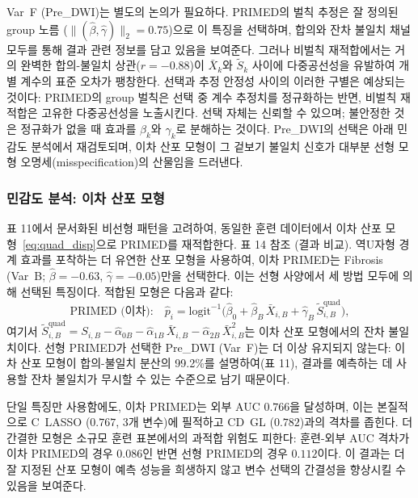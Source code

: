 \documentclass[a4paper,11pt]{article}
\begin{document}
Var~F (Pre\_DWI)는 별도의 논의가 필요하다.
PRIMED의 벌칙 추정은 잘 정의된 group 노름 ($\|(\hat\beta, \hat\gamma)\|_2 = 0.75$)으로 이 특징을 선택하며, 합의와 잔차 불일치 채널 모두를 통해 결과 관련 정보를 담고 있음을 보여준다.
그러나 비벌칙 재적합에서는 거의 완벽한 합의-불일치 상관($r = -0.88$)이 $\bar X_k$와 $\tilde S_k$ 사이에 다중공선성을 유발하여 개별 계수의 표준 오차가 팽창한다.
선택과 추정 안정성 사이의 이러한 구별은 예상되는 것이다: PRIMED의 group 벌칙은 선택 중 계수 추정치를 정규화하는 반면, 비벌칙 재적합은 고유한 다중공선성을 노출시킨다.
선택 자체는 신뢰할 수 있으며; 불안정한 것은 정규화가 없을 때 효과를 $\beta_k$와 $\gamma_k$로 분해하는 것이다.
Pre\_DWI의 선택은 아래 민감도 분석에서 재검토되며, 이차 산포 모형이 그 겉보기 불일치 신호가 대부분 선형 모형 오명세(misspecification)의 산물임을 드러낸다.

\subsubsection{민감도 분석: 이차 산포 모형}

표 11에서 문서화된 비선형 패턴을 고려하여, 동일한 훈련 데이터에서 이차 산포 모형~\eqref{eq:quad_disp}으로 PRIMED를 재적합한다.
표 14 참조 (결과 비교).
역U자형 경계 효과를 포착하는 더 유연한 산포 모형을 사용하여, 이차 PRIMED는 Fibrosis (Var~B; $\hat\beta = -0.63$, $\hat\gamma = -0.05$)만을 선택한다. 이는 선형 사양에서 세 방법 모두에 의해 선택된 특징이다.
적합된 모형은 다음과 같다:
\[
  \text{PRIMED (이차):} \quad \hat p_i = \mathrm{logit}^{-1}\!\bigl(\hat\beta_0 + \hat\beta_B\,\bar X_{i,B} + \hat\gamma_B\,\tilde S_{i,B}^{\mathrm{quad}}\bigr),
\]
여기서 $\tilde S_{i,B}^{\mathrm{quad}} = S_{i,B} - \hat\alpha_{0B} - \hat\alpha_{1B}\,\bar X_{i,B} - \hat\alpha_{2B}\,\bar X_{i,B}^2$는 이차 산포 모형에서의 잔차 불일치이다.
선형 PRIMED가 선택한 Pre\_DWI (Var~F)는 더 이상 유지되지 않는다: 이차 산포 모형이 합의-불일치 분산의 99.2\%를 설명하여(표 11), 결과를 예측하는 데 사용할 잔차 불일치가 무시할 수 있는 수준으로 남기 때문이다.

단일 특징만 사용함에도, 이차 PRIMED는 외부 AUC $0.766$을 달성하며, 이는 본질적으로 C~LASSO ($0.767$, 3개 변수)에 필적하고 CD~GL ($0.782$)과의 격차를 좁힌다.
더 간결한 모형은 소규모 훈련 표본에서의 과적합 위험도 피한다: 훈련-외부 AUC 격차가 이차 PRIMED의 경우 $0.086$인 반면 선형 PRIMED의 경우 $0.112$이다.
이 결과는 더 잘 지정된 산포 모형이 예측 성능을 희생하지 않고 변수 선택의 간결성을 향상시킬 수 있음을 보여준다.

\end{document}
